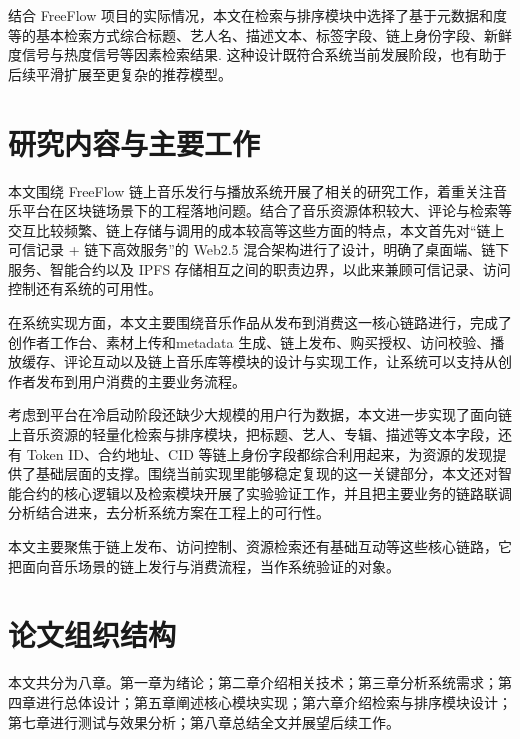 结合 FreeFlow 项目的实际情况，本文在检索与排序模块中选择了基于元数据和度等的基本检索方式综合标题、艺人名、描述文本、标签字段、链上身份字段、新鲜度信号与热度信号等因素检索结果. 这种设计既符合系统当前发展阶段，也有助于后续平滑扩展至更复杂的推荐模型。


\section{研究内容与主要工作}

本文围绕 FreeFlow 链上音乐发行与播放系统开展了相关的研究工作，着重关注音乐平台在区块链场景下的工程落地问题。结合了音乐资源体积较大、评论与检索等交互比较频繁、链上存储与调用的成本较高等这些方面的特点，本文首先对“链上可信记录 + 链下高效服务”的 Web2.5 混合架构进行了设计，明确了桌面端、链下服务、智能合约以及 IPFS 存储相互之间的职责边界，以此来兼顾可信记录、访问控制还有系统的可用性。

在系统实现方面，本文主要围绕音乐作品从发布到消费这一核心链路进行，完成了创作者工作台、素材上传和metadata 生成、链上发布、购买授权、访问校验、播放缓存、评论互动以及链上音乐库等模块的设计与实现工作，让系统可以支持从创作者发布到用户消费的主要业务流程。

考虑到平台在冷启动阶段还缺少大规模的用户行为数据，本文进一步实现了面向链上音乐资源的轻量化检索与排序模块，把标题、艺人、专辑、描述等文本字段，还有 Token ID、合约地址、CID 等链上身份字段都综合利用起来，为资源的发现提供了基础层面的支撑。围绕当前实现里能够稳定复现的这一关键部分，本文还对智能合约的核心逻辑以及检索模块开展了实验验证工作，并且把主要业务的链路联调分析结合进来，去分析系统方案在工程上的可行性。

本文主要聚焦于链上发布、访问控制、资源检索还有基础互动等这些核心链路，它把面向音乐场景的链上发行与消费流程，当作系统验证的对象。


\section{论文组织结构}

本文共分为八章。第一章为绪论；第二章介绍相关技术；第三章分析系统需求；第四章进行总体设计；第五章阐述核心模块实现；第六章介绍检索与排序模块设计；第七章进行测试与效果分析；第八章总结全文并展望后续工作。


